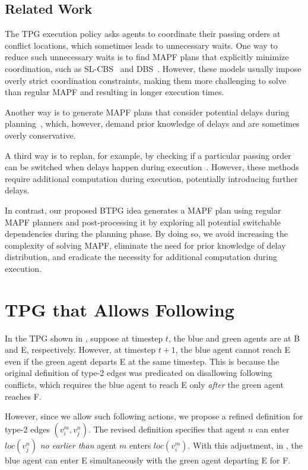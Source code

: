 \documentclass[letterpaper]{article} %
\theoremstyle{definition}
\begin{document}
\subsection{Related Work}

The TPG execution policy asks agents to coordinate their passing orders at conflict locations, which sometimes leads to unnecessary waits.
One way to reduce such unnecessary waits is to find MAPF plans that explicitly minimize coordination, such as SL-CBS~\cite{wagner_minimizing_2022} and DBS~\cite{okumura_offline_2023}. However, these models usually impose overly strict coordination constraints, making them more challenging to solve than regular MAPF and resulting in longer execution times.

Another way is to generate MAPF plans that consider potential delays during planning~\cite{ma_multi-agent_2017, atzmon_robust_2021}, which, however, demand prior knowledge of delays and are sometimes overly conservative.

A third way is to replan, for example, by checking if a particular passing order can be switched when delays happen during execution~\cite{berndt_feedback_2020,paul_fast_2023,pecora_loosely-coupled_2018,coskun_deadlock-free_2021}. However, these methods require additional computation during execution, potentially introducing further delays.

In contrast, our proposed BTPG idea generates a MAPF plan using regular MAPF planners and post-processing it by exploring all potential switchable dependencies during the planning phase. By doing so, we avoid increasing the complexity of solving MAPF, eliminate the need for prior knowledge of delay distribution, and eradicate the necessity for additional computation during execution.





\section{TPG that Allows Following}
In the TPG shown in , suppose at timestep $t$, the blue and green agents are at B and E, respectively. However, at timestep $t+1$, the blue agent cannot reach E even if the green agent departs E at the same timestep. This is because the original definition of type-2 edges was predicated on disallowing following conflicts, which requires the blue agent to reach E only \emph{after} the green agent reaches F.

However, since we allow such following actions, we propose a refined definition for type-2 edges $(v_i^m, v_j^n)$. The revised definition specifies that agent $n$ can enter $loc(v_{j}^n)$ \emph{no earlier than} agent $m$ enters $loc(v_{i}^m)$.
With this adjustment, in , the blue agent can enter E simultaneously with the green agent departing E for F.
\end{document}
